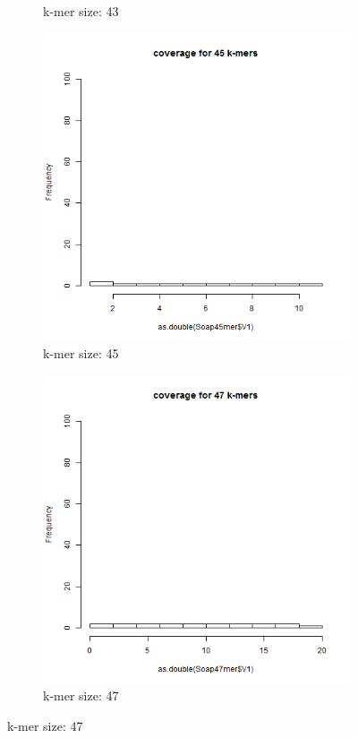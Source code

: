 \documentclass[%
   10pt,              %
   ngerman,           %
   a4paper,           %
   DIV11,             %
]{scrartcl}%
\begin{document}
\begin{figure}[h]
\begin{subfigure}[t] {0.2\textwidth}
		\caption{k-mer size: 43}
		\label{SOAP-43-mers-coverage}
	\end{subfigure}
	\begin{subfigure}[t] {0.2\textwidth}
		\includegraphics[width=\textwidth]{exercise2/Soap45merCoverage.png}
		\caption{k-mer size: 45}
		\label{SOAP-45-mers-coverage}
	\end{subfigure}
	\begin{subfigure}[t] {0.2\textwidth}
		\includegraphics[width=\textwidth]{exercise2/Soap47merCoverage.png}
		\caption{k-mer size: 47}
		\label{SOAP-47-mers-coverage}
	\end{subfigure}


\end{figure}
\end{document}
